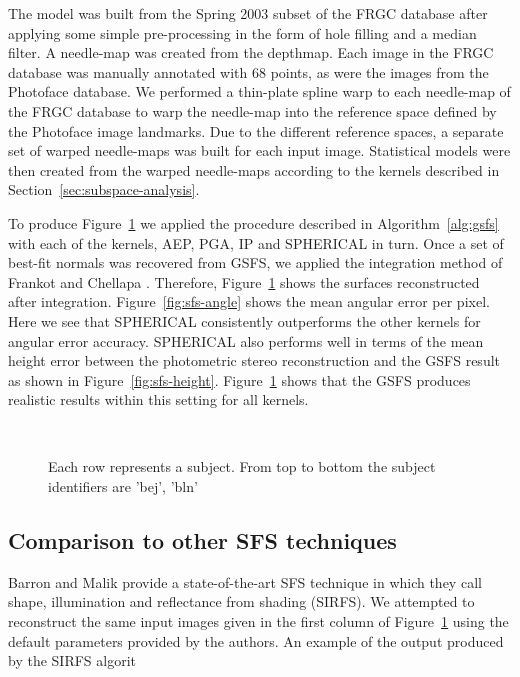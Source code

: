 The model was built from the Spring 2003 subset of the FRGC database after applying some simple pre-processing in the form of hole filling and a median filter. A needle-map was created from the depthmap. Each image in the FRGC database was manually annotated with 68 points, as were the images from the Photoface database. We performed a thin-plate spline warp to each needle-map of the FRGC database to warp the needle-map into the reference space defined by the Photoface image landmarks. Due to the different reference spaces, a separate set of warped needle-maps was built for each input image. Statistical models were then created from the warped needle-maps according to the kernels described in Section~\ref{sec:subspace-analysis}.

To produce Figure~\ref{fig:sfs-results} we applied the procedure described in Algorithm~\ref{alg:gsfs} with each of the kernels, AEP, PGA, IP and SPHERICAL in turn. Once a set of best-fit normals was recovered from GSFS, we applied the integration method of Frankot and Chellapa \cite{RefWorks:99}. Therefore, Figure~\ref{fig:sfs-results} shows the surfaces reconstructed after integration. Figure~\ref{fig:sfs-angle} shows the mean angular error per pixel. Here we see that SPHERICAL consistently outperforms the other kernels for angular error accuracy. SPHERICAL also performs well in terms of the mean height error between the photometric stereo reconstruction and the GSFS result as shown in Figure~\ref{fig:sfs-height}. Figure~\ref{fig:sfs-results} shows that the GSFS produces realistic results within this setting for all kernels.
\begin{figure}
        \centering
         \\
        \caption{Each row represents a subject. From top to bottom the subject identifiers are 'bej', 'bln'}
        \label{fig:sfs-results}
\end{figure}
\subsection{Comparison to other SFS techniques}\label{subsec:sfs-compare}
Barron and Malik provide a state-of-the-art SFS technique in \cite{RefWorks:225,RefWorks:224} which they call shape, illumination and reflectance from shading (SIRFS). We attempted to reconstruct the same input images given in the first column of Figure~\ref{fig:sfs-results} using the default parameters provided by the authors. An example of the output produced by the SIRFS algorit